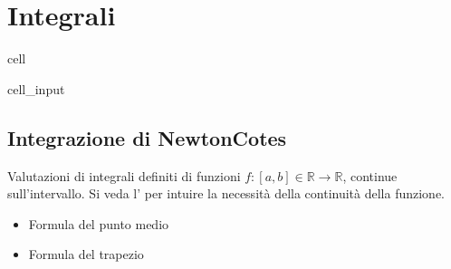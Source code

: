 \documentclass[letterpaper,10pt,english]{jupyterBook}
\begin{document}
\section{Integrali}
\label{\detokenize{ch/numerics/integrals:integrali}}\label{\detokenize{ch/numerics/integrals::doc}}
\begin{sphinxuseclass}{cell}\begin{sphinxVerbatimInput}

\begin{sphinxuseclass}{cell_input}
\begin{sphinxVerbatim}[commandchars=\\\{\}]

   
\end{sphinxVerbatim}

\end{sphinxuseclass}\end{sphinxVerbatimInput}

\end{sphinxuseclass}

\subsection{Integrazione di Newton\sphinxhyphen{}Cotes}
\label{\detokenize{ch/numerics/integrals:integrazione-di-newton-cotes}}
\sphinxAtStartPar
Valutazioni di integrali definiti di funzioni \(f: [a,b] \in \mathbb{R} \rightarrow \mathbb{R}\), continue sull’intervallo. Si veda l’{\hyperref[\detokenize{ch/numerics/integrals:integrals-examples-continuity}]{}} per intuire la necessità della continuità della funzione.
\begin{itemize}
\item {} 
\sphinxAtStartPar
Formula del punto medio

\item {} 
\sphinxAtStartPar
Formula del trapezio

\end{itemize}
\end{document}

